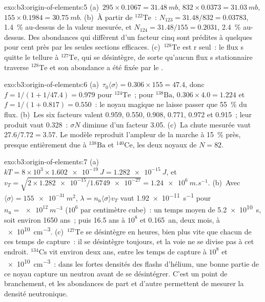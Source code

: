 \begin{solution}{exo:b3:origin-of-elements:5}
(a)~$295\times0.1067 = \qty{31.48}{mb}$, $832\times0.0373 =
\qty{31.03}{mb}$, $155\times0.1984 = \qty{30.75}{mb}$. (b)~À partir de
$^{122}\mathrm{Te}$~: $N_{123} = 31.48/832 = \num{0.03783}$, \qty{1.4}{\percent}
au-dessus de la valeur mesurée, et $N_{124} = 31.48/155 = \num{0.2031}$,
\qty{2.4}{\percent} au-dessus. Des abondances qui diffèrent d'un facteur cinq
sont prédites à quelques pour cent près par les seules sections efficaces.
(c)~$^{128}\mathrm{Te}$ est r seul~: le flux s quitte le tellure
à $^{127}\mathrm{Te}$, qui se désintègre, de sorte qu'aucun flux s stationnaire
traverse $^{128}\mathrm{Te}$ et son abondance a été fixée par le .
\end{solution}

\begin{solution}{exo:b3:origin-of-elements:6}
(a)~$\tau_0\langle\sigma\rangle = 0.306\times155 = 47.4$, donc
$f = 1/(1 + 1/47.4) = \num{0.979}$ pour $^{124}\mathrm{Te}$~; pour
$^{138}\mathrm{Ba}$, $0.306\times4.0 = 1.224$ et $f = 1/(1 + 0.817) =
\num{0.550}$~: le noyau magique ne laisse passer que \qty{55}{\percent} du
flux. (b)~Les six facteurs valent \num{0.959}, \num{0.550}, \num{0.908},
\num{0.771}, \num{0.972} et \num{0.915}~; leur produit vaut \num{0.328}~:
$\sigma N$ diminue d'un facteur \num{3.05}. (c)~La chute mesurée vaut
$27.6/7.72 = 3.57$. Le modèle reproduit l'ampleur de la marche à
\qty{15}{\percent} près, presque entièrement due à $^{138}\mathrm{Ba}$ et
$^{140}\mathrm{Ce}$, les deux noyaux de $N = 82$.
\end{solution}

\begin{solution}{exo:b3:origin-of-elements:7}
(a)~$kT = 8\times10^3\times\qty{1.602e-19}{J} = \qty{1.282e-15}{J}$, et
$v_T = \sqrt{2\times\num{1.282e-15}/\num{1.6749e-27}} =
\qty{1.24e6}{m.s^{-1}}$. (b)~Avec $\langle\sigma\rangle =
\qty{155e-31}{m^2}$, $\lambda = n_\mathrm{n}\langle\sigma\rangle v_T$
vaut \qty{1.92e-11}{s^{-1}} pour $n_\mathrm{n} = \qty{e12}{m^{-3}}$
($10^6$ par centimètre cube)~: un temps moyen de \qty{5.2e10}{s}, soit environ
\num{1650} ans~; puis \num{16.5} ans à $10^8$ et \num{0.165}~an,
deux mois, à \qty{e10}{cm^{-3}}. (c)~$^{127}\mathrm{Te}$ se désintègre en
heures, bien plus vite que chacun de ces temps de capture~: il se désintègre
toujours, et la voie ne se divise pas à cet endroit. $^{134}\mathrm{Cs}$ vit environ deux
ans, entre les temps de capture à $10^8$ et \qty{e10}{cm^{-3}}~: dans les
fortes densités des flashs d'hélium, une bonne partie de ce noyau capture
un neutron avant de se désintégrer. C'est un point de branchement, et les abondances
de part et d'autre permettent de mesurer la densité neutronique.
\end{solution}

